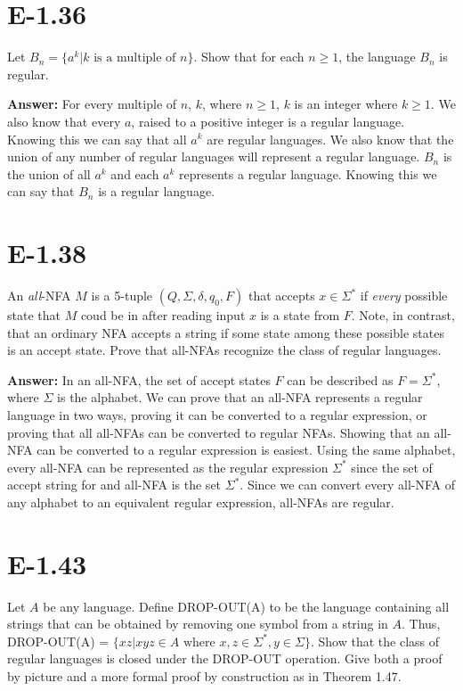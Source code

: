 \documentclass{article}
\begin{document}
\section*{E-1.36}

Let $B_n = \{a^k | k \mbox{\ is a multiple of $n$}\}$.  Show
that for each $n \geq 1$, the language $B_n$ is regular.

{\bf Answer: } 
For every multiple of $n$, $k$, where $n \geq 1$, $k$ is an integer where $k \geq 1$. We also know that every $a$, raised to a positive integer is a regular language.  Knowing this we can say that all $a^k$ are regular languages. We also know that the union of any number of regular languages will represent a regular language. $B_n$ is the union of all $a^k$ and each $a^k$ represents a regular language. Knowing this we can say that $B_n$ is a regular language.

\section*{E-1.38}

An \emph{all}-NFA $M$ is a 5-tuple $(Q, \Sigma, \delta, q_0, F)$ that
accepts $x \in \Sigma^*$ if {\em every} possible state that $M$ coud be in 
after reading input $x$ is a state from $F$.
Note, in contrast, that an ordinary NFA accepts a string if some state among
these possible states is an accept state.
Prove that all-NFAs recognize the class of regular languages.

{\bf Answer: } In an all-NFA, the set of accept states $F$ can be described as $F=\Sigma^*$, where $\Sigma$ is the alphabet. We can prove that an all-NFA represents a regular language in two ways, proving it can be converted to a regular expression, or proving that all all-NFAs can be converted to regular NFAs. Showing that an all-NFA can be converted to a regular expression is easiest. Using the same alphabet, every all-NFA can be represented as the regular expression $\Sigma^*$ since the set of accept string for and all-NFA is the set $\Sigma^*$. Since we can convert every all-NFA of any alphabet to an equivalent regular expression, all-NFAs are regular. 

\section*{E-1.43}

Let $A$ be any language.
Define DROP-OUT(A) to be the language containing all strings that can be obtained by removing
one symbol from a string in $A$.
Thus, DROP-OUT(A) = $\{xz | xyz \in A \mbox{\ where $x,z \in \Sigma^*, y \in \Sigma$}\}$.
Show that the class of regular languages is closed under the DROP-OUT operation.
Give both a proof by picture and a more formal proof by construction
as in Theorem 1.47.
\end{document}

